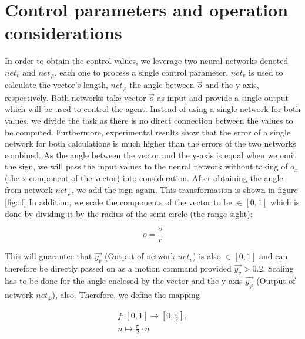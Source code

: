 \documentclass[10pt,a4paper,DIV=11]{scrreprt}
\begin{document}
\section{Control parameters and operation considerations}
In order to obtain the control values, we leverage two neural networks denoted $net_v$ and $net_{\varphi}$, each one to process a single control parameter. 
$net_v$ is used to calculate the vector's length, $net_{\varphi}$ the angle between $\overrightarrow{o}$ and the y-axis, respectively.
Both networks take 
vector $\overrightarrow{o}$ as input and provide a single output which will be used to control the agent. Instead of using a single network
for both values, we divide the task as there is no direct connection between the values to be computed. Furthermore, experimental results show that
the error of a single network for both calculations is much higher than the errors of the two networks combined. As the angle between
the vector and the y-axis is equal when we omit the sign, we will pass the input values to the neural network without taking of $o_x$ (the x component
of the vector) into consideration. After obtaining the angle from network $net_{\varphi}$, we add the sign again. This transformation is shown in figure \ref{fig:tf}
In addition, we scale the components of the vector to be $\in [0,1]$ which is done by dividing it by the radius of the semi circle (the range sight):

\begin{equation}
    o = \frac{o}{r}
\end{equation}

This will guarantee that $\overrightarrow{y_v}$ (Output of network $net_v$) is also $\in [0,1]$ and can therefore
be directly passed on as a motion command provided $\overrightarrow{y_v} > 0.2$. Scaling has to be done for the angle enclosed by the vector and the y-axis 
$\overrightarrow{y_{\varphi}}$ (Output of network $net_{\varphi}$), also. Therefore, we define the mapping

\begin{gather*} 
        f: [0,1] \rightarrow [0,\frac{\pi}{2}], \\ 
        n \mapsto \frac{\pi}{2} \cdot n
\end{gather*}
\end{document}
